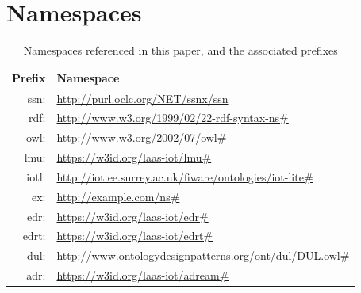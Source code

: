 \documentclass[sw]{iosart2x}
\begin{document}
\appendix

\section{Namespaces}
\label{app:namespaces}
\begin{table}[h]
	\begin{tabular}{r|l}
		Prefix & Namespace\\ \hline
			ssn: & {\footnotesize \url{http://purl.oclc.org/NET/ssnx/ssn}}\\
			rdf: & {\footnotesize \url{http://www.w3.org/1999/02/22-rdf-syntax-ns#}}\\
			owl: & {\footnotesize \url{http://www.w3.org/2002/07/owl#}}\\
			lmu: & {\footnotesize \url{https://w3id.org/laas-iot/lmu#}}\\
			iotl: &{\footnotesize \url{http://iot.ee.surrey.ac.uk/fiware/ontologies/iot-lite#}}\\
			ex: &  {\footnotesize \url{http://example.com/ns#}}\\
			edr: & {\footnotesize \url{https://w3id.org/laas-iot/edr#}}\\
			edrt: & {\footnotesize \url{https://w3id.org/laas-iot/edrt#}}\\
			dul: & {\footnotesize \url{http://www.ontologydesignpatterns.org/ont/dul/DUL.owl#}}\\
			adr: & {\footnotesize \url{https://w3id.org/laas-iot/adream#}}
	\end{tabular}
	\caption{Namespaces referenced in this paper, and the associated prefixes}
\end{table}




\end{document}
